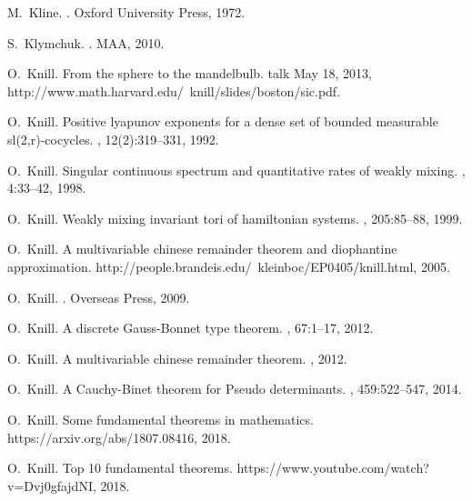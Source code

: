 \documentclass[12pt]{amsart}
\newcounter{example}    \def\example#1{ \item \fontsize{12}{15} \selectfont #1 \fontsize{12}{15} \selectfont }
\begin{document}
\begin{thebibliography}{100}
M.~Kline.
.
\newblock Oxford University Press, 1972.

S.~Klymchuk.
.
\newblock MAA, 2010.

O.~Knill.
\newblock From the sphere to the mandelbulb.
\newblock talk May 18, 2013,
  http://www.math.harvard.edu/~knill/slides/boston/sic.pdf.

O.~Knill.
\newblock Positive lyapunov exponents for a dense set of bounded measurable
  sl(2,r)-cocycles.
, 12(2):319--331, 1992.

O.~Knill.
\newblock Singular continuous spectrum and quantitative rates of weakly mixing.
, 4:33--42, 1998.

O.~Knill.
\newblock Weakly mixing invariant tori of hamiltonian systems.
, 205:85--88, 1999.

O.~Knill.
\newblock A multivariable chinese remainder theorem and diophantine
  approximation.
\newblock http://people.brandeis.edu/~kleinboc/EP0405/knill.html, 2005.

O.~Knill.
.
\newblock Overseas Press, 2009.

O.~Knill.
\newblock A discrete {Gauss-Bonnet} type theorem.
, 67:1--17, 2012.

O.~Knill.
\newblock A multivariable chinese remainder theorem.
, 2012.

O.~Knill.
\newblock A {C}auchy-{B}inet theorem for {P}seudo determinants.
, 459:522--547, 2014.

O.~Knill.
\newblock Some fundamental theorems in mathematics.
\newblock {\\}https://arxiv.org/abs/1807.08416, 2018.

O.~Knill.
\newblock Top 10 fundamental theorems.
\newblock {\\}https://www.youtube.com/watch?v=Dvj0gfajdNI, 2018.


\end{thebibliography}
\end{document}
